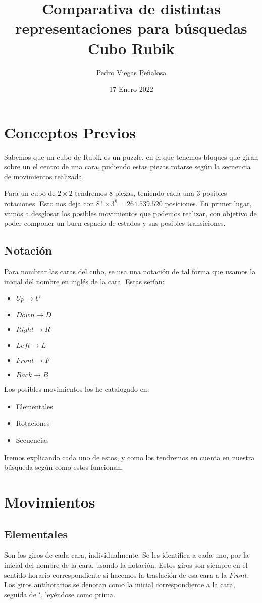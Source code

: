 \documentclass[11pt]{article}
\title{Comparativa de distintas representaciones para búsquedas Cubo Rubik}
\author{Pedro Viegas Peñalosa}
\date{17 Enero 2022}
\begin{document}
\maketitle
\section{Conceptos Previos}
	Sabemos que un cubo de Rubik es un puzzle, en el que tenemos bloques que giran sobre un el centro de una cara, pudiendo estas piezas rotarse según la secuencia de movimientos realizada.

	Para un cubo de $2\times 2$ tendremos 8 piezas, teniendo cada una 3 posibles rotaciones. Esto nos deja con $8\,! \times 3^{8} = 264.539.520$ posiciones.
	En primer lugar, vamos a desglosar los posibles movimientos que podemos realizar, con objetivo de poder componer un buen espacio de estados y sus posibles transiciones.

\subsection{Notación}
	Para nombrar las caras del cubo, se usa una notación de tal forma que usamos la inicial del nombre en inglés de la cara. Estas serían:
\begin{itemize}
	\item{$Up \rightarrow U$}
	\item{$Down \rightarrow D$}
	\item{$Right \rightarrow R$}
	\item{$Left \rightarrow L$}
	\item{$Front \rightarrow F$}
	\item{$Back \rightarrow B$}
\end{itemize}
	Los posibles movimientos los he catalogado en:

\begin{itemize}
	\item Elementales
	\item Rotaciones
	\item Secuencias
\end{itemize}

	Iremos explicando cada uno de estos, y como los tendremos en cuenta en nuestra búsqueda según como estos funcionan.

\section{Movimientos}

\subsection{Elementales}
	Son los giros de cada cara, individualmente. Se les identifica a cada uno, por la inicial del nombre de la cara, usando la notación.
	Estos giros son siempre en el sentido horario correspondiente si hacemos la traslación de esa cara a la $Front$. Los giros antihorarios se denotan como la inicial correspondiente a la cara, seguida de $'$, leyéndose como prima.
	
\end{document}
